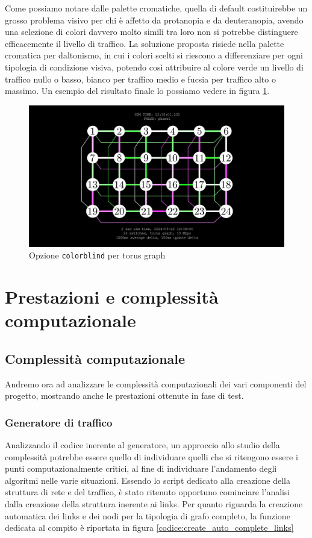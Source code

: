 \documentclass[binding=0.6cm]{sapthesis}
\begin{document}
Come possiamo notare dalle palette cromatiche, quella di default costituirebbe un grosso problema visivo per chi è affetto da protanopia e da deuteranopia, avendo
una selezione di colori davvero molto simili tra loro non si potrebbe distinguere efficacemente il livello di traffico. La soluzione proposta
risiede nella palette cromatica per daltonismo, in cui i colori scelti si riescono a differenziare per ogni tipologia di condizione visiva, potendo così
attribuire al colore verde un livello di traffico nullo o basso, bianco per traffico medio e fucsia per traffico alto o massimo. Un esempio
del risultato finale lo possiamo vedere in figura \ref{fig:colorblind_torus}.

\begin{figure}[h]
    \centering
    \includegraphics[width=1\textwidth]{immagini/colorblind_torus.JPG}
    \caption{Opzione \texttt{colorblind} per torus graph}
    \label{fig:colorblind_torus}
\end{figure}

\chapter{Prestazioni e complessità computazionale}

\section{Complessità computazionale}

Andremo ora ad analizzare le complessità computazionali dei vari componenti del progetto, mostrando anche le prestazioni ottenute in fase di test.

\subsection{Generatore di traffico}
\label{sec:generatore_di_traffico}
Analizzando il codice inerente al generatore, un approccio allo studio della complessità potrebbe essere quello di individuare quelli che si ritengono essere
i punti computazionalmente critici, al fine di individuare l'andamento degli algoritmi nelle varie situazioni. Essendo lo script dedicato alla creazione della struttura di rete e del traffico,
è stato ritenuto opportuno cominciare l'analisi dalla creazione della struttura inerente ai links.
Per quanto riguarda la creazione automatica dei links e dei nodi
per la tipologia di grafo completo, la funzione dedicata al compito è riportata in figura \ref{codice:create_auto_complete_links}
\end{document}
